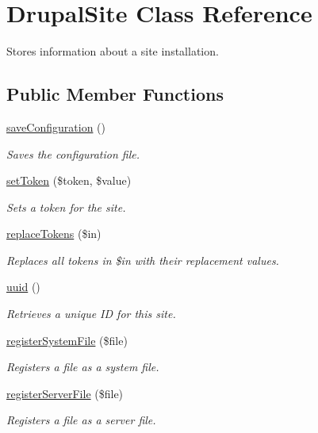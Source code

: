 \hypertarget{classDrupalSite}{\section{Drupal\-Site Class Reference}
\label{classDrupalSite}
}


Stores information about a site installation.  


\subsection*{Public Member Functions}
\begin{DoxyCompactItemize}
\item 
\hyperlink{classDrupalSite_a2b0b0c16eca712ede8f6b281a3956898}{save\-Configuration} ()
\begin{DoxyCompactList}\small\item\em Saves the configuration file. \end{DoxyCompactList}\item 
\hyperlink{classDrupalSite_a97d48f8693619c744e46a08a82e368fe}{set\-Token} (\$token, \$value)
\begin{DoxyCompactList}\small\item\em Sets a token for the site. \end{DoxyCompactList}\item 
\hyperlink{classDrupalSite_a31651eb0ac741ef2ecea5da5d0bee28a}{replace\-Tokens} (\$in)
\begin{DoxyCompactList}\small\item\em Replaces all tokens in \$in with their replacement values. \end{DoxyCompactList}\item 
\hyperlink{classDrupalSite_a95978674ab1047b9b1525e0bfb0fbf67}{uuid} ()
\begin{DoxyCompactList}\small\item\em Retrieves a unique I\-D for this site. \end{DoxyCompactList}\item 
\hyperlink{classDrupalSite_aedd9ec0ad7c0a927326386c525b9172c}{register\-System\-File} (\$file)
\begin{DoxyCompactList}\small\item\em Registers a file as a system file. \end{DoxyCompactList}\item 
\hyperlink{classDrupalSite_adce0bd20228368a9b11c02e2dd8c24c9}{register\-Server\-File} (\$file)
\begin{DoxyCompactList}\small\item\em Registers a file as a server file. \end{DoxyCompactList}\item 

\end{DoxyCompactItemize}
